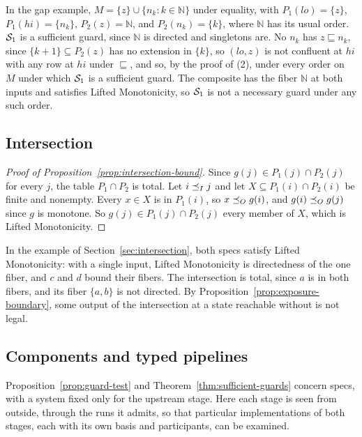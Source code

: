In the gap example, $M=\{z\}\cup\{n_k:k\in\mathbb N\}$ under equality, with
$P_1(\mathit{lo})=\{z\}$, $P_1(\mathit{hi})=\{n_k\}$, $P_2(z)=\mathbb N$, and
$P_2(n_k)=\{k\}$, where $\mathbb N$ has its usual order.  $\mathcal{S}_1$ is a
sufficient guard, since $\mathbb N$ is directed and singletons are.  No $n_k$ has
$z\sqsubseteq n_k$, since $\{k+1\}\subseteq P_2(z)$ has no extension in
$\{k\}$, so $(\mathit{lo},z)$ is not confluent at $\mathit{hi}$ with any row at $\mathit{hi}$
under $\sqsubseteq$, and so, by the proof of (2), under every order on $M$ under
which $\mathcal{S}_1$ is a sufficient guard.  The composite has the fiber $\mathbb N$
at both inputs and satisfies Lifted Monotonicity, so $\mathcal{S}_1$ is not a
necessary guard under any such order.

\subsection{Intersection}
\label{app:intersection}

\begin{proof}[Proof of Proposition~\ref{prop:intersection-bound}]
Since $g(j)\in P_1(j)\cap P_2(j)$ for every $j$, the table $P_1\cap P_2$ is
total.  Let $i\preceq_I j$ and let $X\subseteq P_1(i)\cap P_2(i)$ be finite and
nonempty.  Every $x\in X$ is in $P_1(i)$, so $x\preceq_O g(i)$, and
$g(i)\preceq_O g(j)$ since $g$ is monotone.  So $g(j)\in P_1(j)\cap P_2(j)$
\outrel every member of $X$, which is Lifted Monotonicity.
\end{proof}

In the example of Section~\ref{sec:intersection}, both specs satisfy Lifted
Monotonicity: with a single input, Lifted Monotonicity is directedness of the
one fiber, and $c$ and $d$ bound their fibers.  The intersection is total, since
$a$ is in both fibers, and its fiber $\{a,b\}$ is not directed.  By
Proposition~\ref{prop:exposure-boundary}, some output of the intersection at a
state reachable without \commitment is not legal.

\subsection{Components and typed pipelines}
\label{app:components}

Proposition~\ref{prop:guard-test} and Theorem~\ref{thm:sufficient-guards} concern specs, with a system fixed only
for the upstream stage.  Here each stage is seen from outside, through the
runs it admits, so that particular implementations of both stages, each with
its own basis and participants, can be examined.

